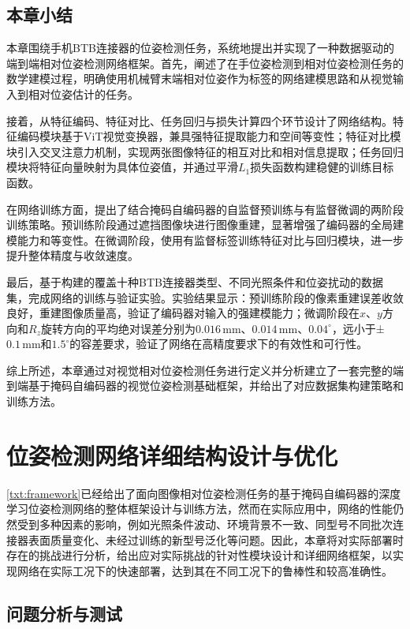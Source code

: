 \documentclass{Diploma}
\begin{document}
\section{本章小结}
本章围绕手机BTB连接器的位姿检测任务，系统地提出并实现了一种数据驱动的端到端相对位姿检测网络框架。首先，阐述了在手位姿检测到相对位姿检测任务的数学建模过程，明确使用机械臂末端相对位姿作为标签的网络建模思路和从视觉输入到相对位姿估计的任务。

接着，从特征编码、特征对比、任务回归与损失计算四个环节设计了网络结构。特征编码模块基于ViT视觉变换器，兼具强特征提取能力和空间等变性；特征对比模块引入交叉注意力机制，实现两张图像特征的相互对比和相对信息提取；任务回归模块将特征向量映射为具体位姿值，并通过平滑$L_1$损失函数构建稳健的训练目标函数。

在网络训练方面，提出了结合掩码自编码器的自监督预训练与有监督微调的两阶段训练策略。预训练阶段通过遮挡图像块进行图像重建，显著增强了编码器的全局建模能力和等变性。在微调阶段，使用有监督标签训练特征对比与回归模块，进一步提升整体精度与收敛速度。

最后，基于构建的覆盖十种BTB连接器类型、不同光照条件和位姿扰动的数据集，完成网络的训练与验证实验。实验结果显示：预训练阶段的像素重建误差收敛良好，重建图像质量高，验证了编码器对输入的强建模能力；微调阶段在$x$、$y$方向和$R_z$旋转方向的平均绝对误差分别为$0.016\,\mathrm{mm}$、$0.014\,\mathrm{mm}$、$0.04^{\circ}$，远小于±$0.1\,\mathrm{mm}$和$1.5^{\circ}$的容差要求，验证了网络在高精度要求下的有效性和可行性。

综上所述，本章通过对视觉相对位姿检测任务进行定义并分析建立了一套完整的端到端基于掩码自编码器的视觉位姿检测基础框架，并给出了对应数据集构建策略和训练方法。
\chapter[modules]{位姿检测网络详细结构设计与优化}
\ref{txt:framework}已经给出了面向图像相对位姿检测任务的基于掩码自编码器的深度学习位姿检测网络的整体框架设计与训练方法，然而在实际应用中，网络的性能仍然受到多种因素的影响，例如光照条件波动、环境背景不一致、同型号不同批次连接器表面质量变化、未经过训练的新型号泛化等问题。因此，本章将对实际部署时存在的挑战进行分析，给出应对实际挑战的针对性模块设计和详细网络框架，以实现网络在实际工况下的快速部署，达到其在不同工况下的鲁棒性和较高准确性。
\section{问题分析与测试}
\end{document}
